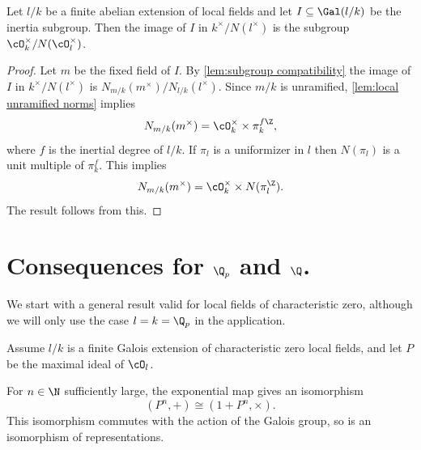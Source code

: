 \begin{lemma} \label{lem:local image inertia}
	Let $l/k$ be a finite abelian extension of local fields and let $I \subseteq \Gal(l/k)$ be
	the inertia subgroup.
	Then the image of $I$ in $k^\times / N(l^\times)$
	is the subgroup $\cO_k^\times / N(\cO_l^\times)$.
\end{lemma}

\begin{proof}
	Let $m$ be the fixed field of $I$.
	By \ref{lem:subgroup compatibility} the image of $I$ in $k^\times / N(l^\times)$
	is $N_{m/k}(m^\times) / N_{l/k}(l^\times)$.
	Since $m/k$ is unramified, \ref{lem:local unramified norms} implies
	\[
		N_{m/k}(m^\times) = \cO_k^\times \times \pi_k^{f\Z},
	\]
	where $f$ is the inertial degree of $l/k$.
	If $\pi_l$ is a uniformizer in $l$ then $N(\pi_l)$ is a unit multiple of $\pi_k^f$.
	This implies
	\[
		N_{m/k}(m^\times) = \cO_k^\times \times N(\pi_l^{\Z}).
	\]
	The result follows from this.
\end{proof}

\section{Consequences for $\Q_p$ and $\Q$.}

We start with a general result valid for local fields of characteristic zero, although
we will only use the case $l=k=\Q_p$ in the application.

\begin{lemma}\label{lem:local isomorphism}
	Assume $l/k$ is a finite Galois extension of characteristic zero local fields, and let $P$ be the maximal
	ideal of $\cO_l$.

	For $n \in \N$ sufficiently large, the
	exponential map gives an isomorphism
	\[
		(P^n,+) \cong (1 + P^n, \times).
	\]
	This isomorphism commutes with the action of the Galois group, so is an
	isomorphism of representations.
\end{lemma}

